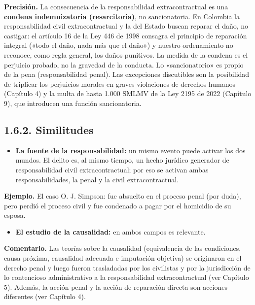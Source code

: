 \begin{precision}
\textcolor[HTML]{9C2B2B}{\textbf{Precisión. }}La consecuencia de la responsabilidad extracontractual es una \textbf{condena indemnizatoria (resarcitoria)}, no sancionatoria. En Colombia la responsabilidad civil extracontractual y la del Estado buscan reparar el daño, no castigar: el artículo 16 de la Ley 446 de 1998 consagra el principio de reparación integral («todo el daño, nada más que el daño») y nuestro ordenamiento no reconoce, como regla general, los daños punitivos. La medida de la condena es el perjuicio probado, no la gravedad de la conducta. Lo «sancionatorio» es propio de la pena (responsabilidad penal). Las excepciones discutibles son la posibilidad de triplicar los perjuicios morales en graves violaciones de derechos humanos (Capítulo 4) y la multa de hasta 1.000 SMLMV de la Ley 2195 de 2022 (Capítulo 9), que introducen una función sancionatoria.
\end{precision}
\subsection{1.6.2. Similitudes}
\begin{itemize}
\item \textbf{La fuente de la responsabilidad:} un mismo evento puede activar los dos mundos. El delito es, al mismo tiempo, un hecho jurídico generador de responsabilidad civil extracontractual; por eso se activan ambas responsabilidades, la penal y la civil extracontractual.
\end{itemize}
\begin{ejemplo}
\textcolor[HTML]{4F6228}{\textbf{Ejemplo. }}El caso O. J. Simpson: fue absuelto en el proceso penal (por duda), pero perdió el proceso civil y fue condenado a pagar por el homicidio de su esposa.
\end{ejemplo}
\begin{itemize}
\item \textbf{El estudio de la causalidad:} en ambos campos es relevante.
\end{itemize}
\begin{comentario}
\textcolor[HTML]{8A6D3B}{\textbf{Comentario. }}Las teorías sobre la causalidad (equivalencia de las condiciones, causa próxima, causalidad adecuada e imputación objetiva) se originaron en el derecho penal y luego fueron trasladadas por los civilistas y por la jurisdicción de lo contencioso administrativo a la responsabilidad extracontractual (ver Capítulo 5). Además, la acción penal y la acción de reparación directa son acciones diferentes (ver Capítulo 4).
\end{comentario}
